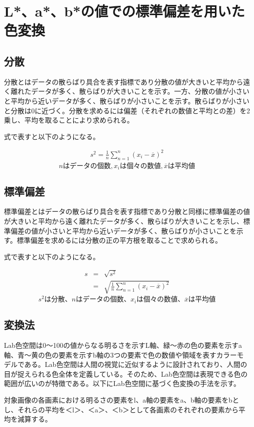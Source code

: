 \newpage
\section{L*、a*、b*の値での標準偏差を用いた色変換}
\subsection{分散}
分散とはデータの散らばり具合を表す指標であり分散の値が大きいと平均から遠く離れたデータが多く、散らばりが大きいことを示す。一方、分散の値が小さいと平均から近いデータが多く、散らばりが小さいことを示す。散らばりが小さいと分散は0に近づく。分散を求めるには偏差（それぞれの数値と平均との差）を2乗し、平均を取ることにより求められる。\cite{4}\par
式で表すと以下のようになる。\par
\begin{eqnarray}
  s^2 = \frac{1}{n}\sum_{n=1}^n (x_i-\overline{x})^2
\end{eqnarray}
\[
nはデータの個数,x_iは個々の数値,\overline{x}は平均値
\]
\subsection{標準偏差}
標準偏差とはデータの散らばり具合を表す指標であり分散と同様に標準偏差の値が大きいと平均から遠く離れたデータが多く、散らばりが大きいことを示し、標準偏差の値が小さいと平均から近いデータが多く、散らばりが小さいことを示す。標準偏差を求めるには分散の正の平方根を取ることで求められる。\cite{5}\par
式で表すと以下のようになる。\par
\begin{eqnarray}
 s　&=& \sqrt{s^2}\\
  &=& \sqrt{\frac{1}{n}\sum_{n=1}^n (x_i-\overline{x})^2}
\end{eqnarray}
\[
s^2は分散、nはデータの個数、x_iは個々の数値、\overline{x}は平均値
\]

\newpage
\subsection{変換法}
 Lab色空間は0～100の値からなる明るさを示すL軸、緑〜赤の色の要素を示すa軸、青〜黄の色の要素を示すb軸の3つの要素で色の数値や領域を表すカラーモデルである。Lab色空間は人間の視覚に近似するように設計されており、人間の目が捉えられる色全体を定義している。そのため、Lab色空間は表現できる色の範囲が広いのが特徴である。以下にLab色空間に基づく色変換の手法を示す。\par
対象画像の各画素における明るさの要素をl、a軸の要素をa、b軸の要素をbとし、それらの平均を＜l＞、＜a＞、＜b＞として各画素のそれぞれの要素から平均を減算する。

